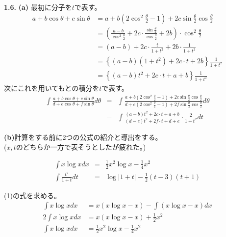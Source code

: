 \documentclass [15pt,titlepage]{jarticle}
\begin{document}
\begin{comment}
演習問題(1.6)
\end{comment}
\textbf{1.6.}
\textbf{(a)}
最初に分子を$t$で表す。
\begin{align*}
	a+b\cos\theta+c\sin\theta 
		&=
\displaystyle	
	a+b(2\cos^2\frac{\theta}{2}-1)+2c\sin\frac{\theta}{2}\cos\frac{\theta}{2}\\
		&=
	\left(
	\frac{a-b}{\cos^2\frac{\theta}{2}}+2c\cdot\frac{\sin\frac{\theta}{2}}{\cos\frac{\theta}{2}}+2b
	\right)
	\cdot\cos^2\frac{\theta}{2}\\
		&=(a-b)+2c\cdot\frac{t}{1+t^2}+2b\cdot\frac{1}{1+t^2}\\
		&=
	\left\{
		(a-b)(1+t^2)+2c\cdot t+2b
	\right\}\frac{1}{1+t^2}\\
		&=
	\left\{
		(a-b)t^2+2c\cdot t+a+b
	\right\}\frac{1}{1+t^2}
\end{align*}
次にこれを用いてもとの積分を$t$で表す。
\begin{eqnarray*}
\displaystyle
	\int\frac{a+b\cos\theta+c\sin\theta}
			{d+e\cos\theta+f\sin\theta}d\theta
	&=&
	\int\frac{a+b(2\cos^2\frac{\theta}{2}-1)+2c\sin\frac{\theta}{2}\cos\frac{\theta}{2}}
			{d+e(2\cos^2\frac{\theta}{2}-1)+2f\sin\frac{\theta}{2}\cos\frac{\theta}{2}}d\theta \\
	&=&
	\int\frac{(a-b)t^2+2c\cdot t+a+b}{(d-e)t^2+2f\cdot t+d+e}\cdot \frac{2}{1+t^2}dt
\end{eqnarray*}


\newpage

\textbf{(b)}計算をする前に2つの公式の紹介と導出をする。\\
($x,t$のどちらか一方で表そうとしたが疲れた。)

\begin{eqnarray}
\int x\log xdx
	&=&\frac{1}{2}x^2\log x-\frac{1}{4}x^2 \\
\int\frac{t^2}{1+t}dt
	&=&\log\lvert1+t\rvert-\frac{1}{2}(t-3)(t+1)
\end{eqnarray}

(1)の式を求める。
\begin{align*}
\int x\log xdx
	&=x(x\log x-x)-\int (x\log x-x)dx \\
2\int x\log xdx
	&=x(x\log x-x)+\frac{1}{2}x^2 \\
\int x\log xdx
	&=\frac{1}{2}x^2\log x-\frac{1}{4}x^2 \\
\end{align*}
\end{document}
